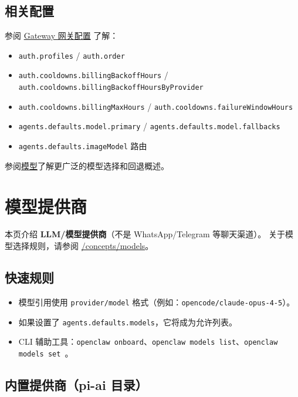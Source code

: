\subsection{相关配置}


参阅 \href{/gateway/configuration}{Gateway 网关配置} 了解：

\begin{itemize}
  \item \texttt{auth.profiles} / \texttt{auth.order}
  \item \texttt{auth.cooldowns.billingBackoffHours} / \texttt{auth.cooldowns.billingBackoffHoursByProvider}
  \item \texttt{auth.cooldowns.billingMaxHours} / \texttt{auth.cooldowns.failureWindowHours}
  \item \texttt{agents.defaults.model.primary} / \texttt{agents.defaults.model.fallbacks}
  \item \texttt{agents.defaults.imageModel} 路由
\end{itemize}


参阅\href{/concepts/models}{模型}了解更广泛的模型选择和回退概述。


\clearpage

\section{模型提供商}


本页介绍 \textbf{LLM/模型提供商}（不是 WhatsApp/Telegram 等聊天渠道）。
关于模型选择规则，请参阅 \href{/concepts/models}{/concepts/models}。

\subsection{快速规则}


\begin{itemize}
  \item 模型引用使用 \texttt{provider/model} 格式（例如：\texttt{opencode/claude-opus-4-5}）。
  \item 如果设置了 \texttt{agents.defaults.models}，它将成为允许列表。
  \item CLI 辅助工具：\texttt{openclaw onboard}、\texttt{openclaw models list}、\texttt{openclaw models set }。
\end{itemize}


\subsection{内置提供商（pi-ai 目录）}


